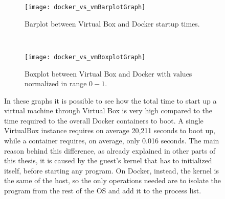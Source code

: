 \begin{figure}[H]
    \centering
    \begin{subfigure}[b]{0.4\textwidth}
        \texttt{[image: docker\_vs\_vmBarplotGraph]}
        \caption{Barplot between Virtual Box and Docker startup times.}
        \label{chap:tests:sec:dockervsvb:img:barplot}
    \end{subfigure}
    ~
    \begin{subfigure}[b]{0.4\textwidth}
        \texttt{[image: docker\_vs\_vmBoxplotGraph]}
        \caption{Boxplot between Virtual Box and Docker with values normalized 
in range $0-1$.}
        \label{chap:tests:sec:dockervsvb:img:boxplot}
    \end{subfigure}
    \caption[Virtual Box vs Docker start up comparison]{In these graphs it is
      possible to see how the total time to start up a virtual machine through
      Virtual Box is very high compared to the time required to the overall
      Docker containers to boot. A single VirtualBox instance requires on
      average 20,211 seconds to boot up, while a container requires, on average,
      only 0.016 seconds. The main reason behind this difference, as already
      explained in other parts of this thesis, it is caused by the guest's
      kernel that has to initialized itself, before starting any program. On
      Docker, instead, the kernel is the same of the host, so the only
      operations needed are to isolate the program from the rest of the OS and
      add it to the process list.}
    \label{chap:tests:sec:dockervsvb:subimg:plots}
\end{figure}


\begin{table}[t]
\centering
{}
\caption[Docker vs Virtual Box start up times comparison]{Docker vs Virtual Box
  start up times comparison. Is possible to see how the overall time required to
  start $100$ containers is less than the time to start one traditional virtual
  machine. The overall time required by the traditional virtualization system is
  approximately of 33 minutes, witch gives a significant insight of how much
  time is required to create and boot a virtualized environment.}
\label{my-label}
\end{table}


